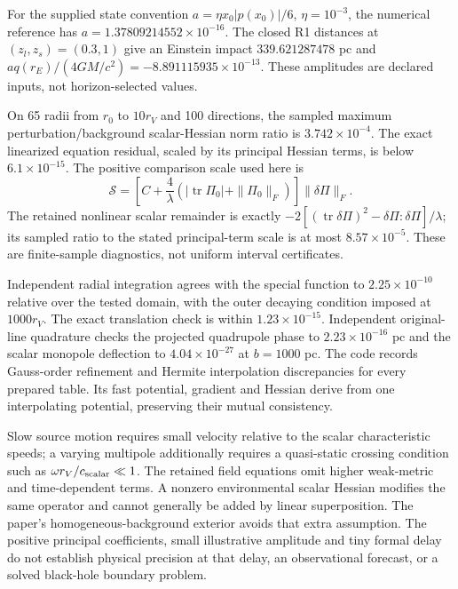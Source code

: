 For the supplied state convention
$a=\eta x_0|p(x_0)|/6$, $\eta=10^{-3}$, the numerical reference has
$a=1.37809214552\times10^{-16}$. The closed R1 distances at
$(z_l,z_s)=(0.3,1)$ give an Einstein impact $339.621287478$ pc and
$a q(r_E)/(4GM/c^2)=-8.891115935\times10^{-13}$.
These amplitudes are declared inputs, not horizon-selected values.

On 65 radii from $r_0$ to $10r_V$ and 100 directions, the sampled
maximum perturbation/background scalar-Hessian norm ratio is
$3.742\times10^{-4}$. The exact linearized equation residual, scaled
by its principal Hessian terms, is below $6.1\times10^{-15}$. The positive
comparison scale used here is
\begin{equation}
 \mathcal S=\left[C+\frac4\lambda
 (|\operatorname{tr}\Pi_0|+\|\Pi_0\|_F)\right]\|\delta\Pi\|_F .
\end{equation}
The retained nonlinear scalar remainder is exactly
$-2[(\operatorname{tr}\delta\Pi)^2-\delta\Pi:\delta\Pi]/\lambda$;
its sampled ratio to the stated principal-term scale is at most
$8.57\times10^{-5}$. These are finite-sample diagnostics, not uniform
interval certificates.

Independent radial integration agrees with the special function to
$2.25\times10^{-10}$ relative over the tested domain, with the outer
decaying condition imposed at $1000r_V$. The exact translation check is
within $1.23\times10^{-15}$. Independent original-line quadrature
checks the projected quadrupole phase to $2.23\times10^{-16}$ pc and
the scalar monopole deflection to $4.04\times10^{-27}$ at $b=1000$ pc.
The code records Gauss-order refinement and Hermite interpolation
discrepancies for every prepared table. Its fast potential, gradient
and Hessian derive from one interpolating potential, preserving their
mutual consistency.

Slow source motion requires small velocity relative to the scalar
characteristic speeds; a varying multipole additionally requires a
quasi-static crossing condition such as $\omega r_V/c_{\rm scalar}\ll1$.
The retained field equations omit higher weak-metric and time-dependent
terms. A nonzero environmental scalar Hessian modifies the same
operator and cannot generally be added by linear superposition. The
paper's homogeneous-background exterior avoids that extra assumption.
The positive principal coefficients, small illustrative amplitude and
tiny formal delay do not establish physical precision at that delay,
an observational forecast, or a solved black-hole boundary problem.

